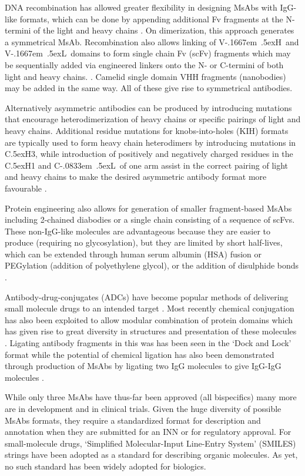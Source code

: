 \documentclass[a4paper]{article}
\newcommand{\VH}{\mbox{V\kern-.1667em \lower.5ex\hbox{\scriptsize H}}}
\newcommand{\VL}{\mbox{V\kern-.1667em \lower.5ex\hbox{\scriptsize L}}}
\newcommand{\CH}[1]{\mbox{C\lower.5ex\hbox{\scriptsize H}#1}}
\newcommand{\CL}{\mbox{C\kern-.0833em \lower.5ex\hbox{\scriptsize L}}}
\begin{document}
DNA recombination has allowed greater flexibility in designing MsAbs
with IgG-like formats, which can be done by appending additional Fv
fragments at the N-termini of the light and heavy chains
\cite{brinkmann:2017}. On dimerization, this approach generates a symmetrical MsAb.
Recombination also allows linking of \VH\ and \VL\ domains to
form single chain Fv (scFv) fragments
which may be sequentially added via engineered
linkers onto the N- or C-termini of both light and heavy chains.
\cite{legall:1999}. Camelid single domain VHH fragments (nanobodies)
may be added in the same way. All of these give rise to symmetrical antibodies.

Alternatively asymmetric antibodies can be produced by introducing mutations
that encourage heterodimerization of heavy chains or specific pairings of light and heavy chains.
Additional residue mutations for knobs-into-holes (KIH)
formats \cite{ridgway:1996} are typically used to form heavy chain heterodimers
by introducing mutations in \CH{3},
while introduction of positively and negatively
charged residues in the \CH{1} and \CL\ of one arm \cite{gunasekaran:2010} assist in the correct
pairing of light and heavy chains to make the desired asymmetric antibody format more favourable
\cite{spiess:2015}.   

Protein engineering also allows for generation of 
smaller fragment-based MsAbs including 2-chained diabodies or a single
chain consisting of a sequence of scFvs.
These non-IgG-like molecules are
advantageous because they are easier to produce (requiring no glycosylation),
but they are limited by short
half-lives, which can be extended through human serum albumin (HSA)
fusion or PEGylation (addition of polyethylene glycol), or the addition of
disulphide bonds \cite{kontermann:2011,ma:2021}. 

Antibody-drug-conjugates (ADCs) have become
popular methods of delivering small molecule drugs to an intended
target \cite{sau:2017}. Most recently chemical conjugation has also been exploited to allow modular combination of protein domains which
has given rise to great diversity in structures and presentation of
these molecules \cite{spiess:2015}. Ligating antibody
fragments in this was has been seen in the `Dock and Lock' format
while the potential of chemical ligation
has also been demonstrated through production of MsAbs by ligating two IgG molecules to
give IgG-IgG molecules \cite{szijj:2021}.  

While only three MsAbs have thus-far been approved (all bispecifics)
many more are in development and in clinical trials.
Given the huge diversity of possible MsAbs formats, they require a
standardized format for description and annotation when they are
submitted for an INN or for regulatory approval. For small-molecule drugs,
`Simplified Molecular-Input Line-Entry System' (SMILES) strings 
\cite{weininger:smiles} have been adopted as a standard for describing
organic molecules. As yet, no such standard has been widely adopted for biologics.
\end{document}
